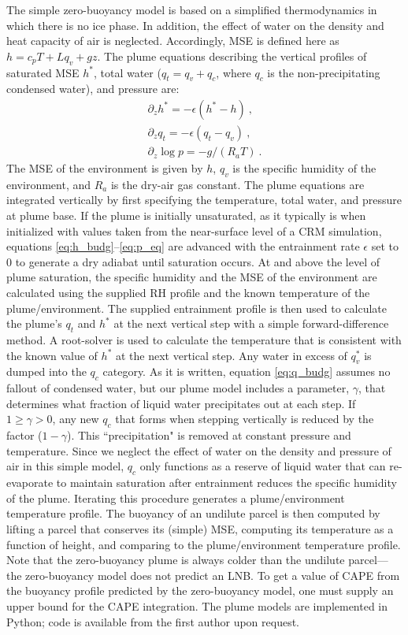 \documentclass[draft,grl]{agutexSI}
\begin{document}
\begin{article}
The simple zero-buoyancy model is based on a simplified thermodynamics in which there is no ice phase. In addition, the effect of water on the density and heat capacity of air is neglected. Accordingly, MSE is defined here as $h = c_p T + L q_v + gz$. The plume equations describing the vertical profiles of saturated MSE $h^*$, total water ($q_t = q_v + q_c$, where $q_c$ is the non-precipitating condensed water), and pressure are: 
\begin{eqnarray}
&\partial_z h^* = -\epsilon \left(h^* - h\right)\ ,& \label{eq:h_budg}\\
&\partial_z q_t = -\epsilon \left(q_t - q_{v}\right)\ ,&\label{eq:q_budg} \\ 
&\partial_z \log p = -g/(R_a T)\ . & \label{eq:p_eq}
\end{eqnarray}
\noindent The MSE of the environment is given by $h$, $q_v$ is the specific humidity of the environment, and $R_a$ is the dry-air gas constant. The plume equations are integrated vertically by first specifying the temperature, total water, and pressure at plume base. If the plume is initially unsaturated, as it typically is when initialized with values taken from the near-surface level of a CRM simulation, equations \ref{eq:h_budg}--\ref{eq:p_eq} are advanced with the entrainment rate $\epsilon$ set to 0 to generate a dry adiabat until saturation occurs. At and above the level of plume saturation, the specific humidity and the MSE of the environment are calculated using the supplied RH profile and the known temperature of the plume/environment. The supplied entrainment profile is then used to calculate the plume's $q_t$ and $h^*$ at the next vertical step with a simple forward-difference method. A root-solver is used to calculate the temperature that is consistent with the known value of $h^*$ at the next vertical step. Any water in excess of $q_v^*$ is dumped into the $q_c$ category. As it is written, equation \ref{eq:q_budg} assumes no fallout of condensed water, but our plume model includes a parameter, $\gamma$, that determines what fraction of liquid water precipitates out at each step. If $1\ge \gamma > 0$, any new $q_c$ that forms when stepping vertically is reduced by the factor ($1-\gamma$). This ``precipitation" is removed at constant pressure and temperature. Since we neglect the effect of water on the density and pressure of air in this simple model, $q_c$ only functions as a reserve of liquid water that can re-evaporate to maintain saturation after entrainment reduces the specific humidity of the plume. Iterating this procedure generates a plume/environment temperature profile. The buoyancy of an undilute parcel is then computed by lifting a parcel that conserves its (simple) MSE, computing its temperature as a function of height, and comparing to the plume/environment temperature profile. Note that the zero-buoyancy plume is always colder than the undilute parcel---the zero-buoyancy model does not predict an LNB. To get a value of CAPE from the buoyancy profile predicted by the zero-buoyancy model, one must supply an upper bound for the CAPE integration. The plume models are implemented in Python; code is available from the first author upon request.


\end{article}
\end{document}
